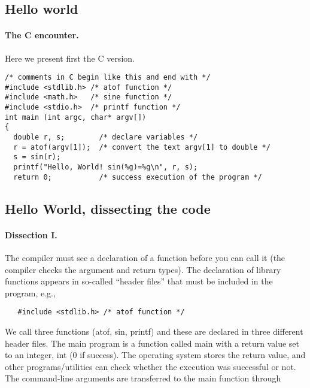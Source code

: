 \documentclass[%
oneside,                 %
final,                   %
10pt]{article}
\begin{document}
\subsection*{Hello world}


\paragraph{The C encounter.}
Here we present first the C version.

\begin{verbatim}
/* comments in C begin like this and end with */
#include <stdlib.h> /* atof function */
#include <math.h>   /* sine function */
#include <stdio.h>  /* printf function */
int main (int argc, char* argv[])
{
  double r, s;        /* declare variables */
  r = atof(argv[1]);  /* convert the text argv[1] to double */
  s = sin(r);
  printf("Hello, World! sin(%g)=%g\n", r, s);
  return 0;           /* success execution of the program */

\end{verbatim}



\subsection*{Hello World, dissecting the code}


\paragraph{Dissection I.}
The compiler must see a declaration of a function before you can
call it (the compiler checks the argument and return types).
The declaration of library functions appears
in so-called ``header files'' that must be included in the program, e.g.,

\begin{verbatim}
   #include <stdlib.h> /* atof function */
\end{verbatim}
We call three functions (atof, sin, printf)
and these are declared in three different header files.
The main program is a function called main
with a return value set to an integer, int (0 if success).
The operating system stores the return value,
and other programs/utilities can check whether
the execution was successful or not.
The command-line arguments are transferred to the main function through
\end{document}
